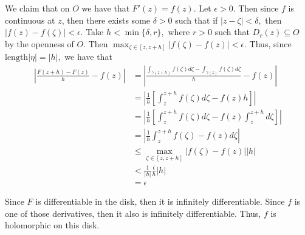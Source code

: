 \documentclass[11pt]{article}
\begin{document}
\begin{solution}
    
    We claim that on $O$ we have that $F'(z) = f(z).$ Let $\epsilon>0.$ Then since $f$ is continuous at $z$, then there exists some $\delta>0$ such that if $|z - \zeta| < \delta,$ then $|f(z) - f(\zeta)|< \epsilon.$ Take $h<\min\{\delta, r\},$ where $r>0$ such that $D_r(z)\subseteq O$ by the openness of $O.$ Then $\max_{\zeta \in [z, z+ h]}|f(\zeta) - f(z)| < \epsilon.$ Thus, since $\text{length}|\eta| = |h|,$ we have that
\begin{align*}
    \left|\frac{F(z + h) - F(z)}{h} - f(z)\right| &= \left| \frac{\int_{\gamma(z +h)}f(\zeta)d\zeta - \int_{\gamma(z)} f(\zeta)d\zeta}{h} - f(z)\right|\\
    &= \left| \frac{1}{h} \left[ \int_{z}^{z+h}f(\zeta)d\zeta - f(z)h \right]\right|\\
    &= \left|\frac{1}{h}\left[\int_z^{z + h}f(\zeta)d\zeta - f(z)\int_{z}^{z + h} d\zeta\right]\right|\\
    &= \left|\frac{1}{h}\int_z^{z + h}f(\zeta) - f(z)d\zeta\right|\\
    &\leq \max_{\zeta \in [z, z+ h]}|f(\zeta) - f(z)| |h|\\
    &< \frac{1}{|h|}\frac{\epsilon}{h} |h|\\
    &= \epsilon
\end{align*}

Since $F$ is differentiable in the disk, then it is infinitely differentiable. Since $f$ is one of those derivatives, then it also is infinitely differentiable. Thus, $f$ is holomorphic on this disk.
\end{solution}
\end{document}

